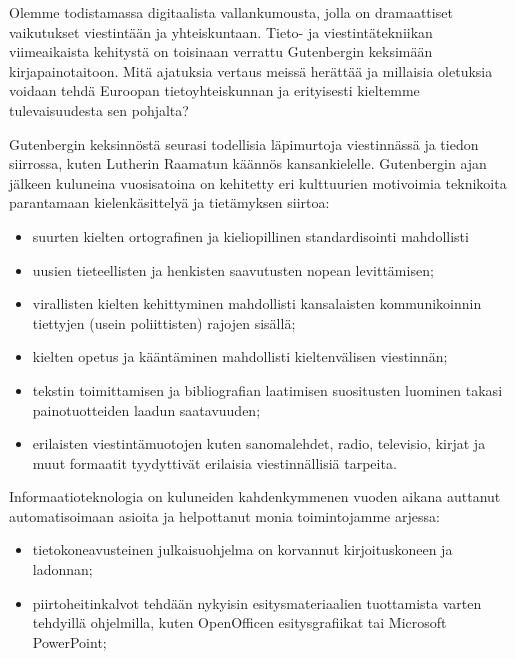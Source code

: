 \documentclass[]{../../metanetpaper}
\begin{document}
\begin{multicols}{2}

Olemme todistamassa digitaalista vallankumousta, jolla on dramaattiset
vaikutukset viestintään ja yhteiskuntaan. Tieto- ja viestintätekniikan
viimeaikaista kehitystä on toisinaan verrattu Gutenbergin keksimään
kirjapainotaitoon. Mitä ajatuksia vertaus meissä herättää ja millaisia
oletuksia voidaan tehdä Euroopan tietoyhteiskunnan ja erityisesti kieltemme
tulevaisuudesta sen pohjalta?

Gutenbergin keksinnöstä seurasi todellisia läpimurtoja viestinnässä ja tiedon
siirrossa, kuten Lutherin Raamatun käännös kansankielelle. Gutenbergin
ajan jälkeen kuluneina vuosisatoina on kehitetty eri kulttuurien motivoimia
teknikoita parantamaan kielenkäsittelyä ja tietämyksen siirtoa:
\begin{itemize}
\item suurten kielten ortografinen ja kieliopillinen standardisointi mahdollisti
\item uusien tieteellisten ja henkisten saavutusten nopean levittämisen;

\item virallisten kielten kehittyminen mahdollisti kansalaisten kommunikoinnin
tiettyjen (usein poliittisten) rajojen sisällä;

\item kielten opetus ja kääntäminen mahdollisti kieltenvälisen viestinnän;

\item tekstin toimittamisen ja bibliografian laatimisen suositusten luominen takasi
painotuotteiden laadun saatavuuden;

\item erilaisten viestintämuotojen kuten sanomalehdet, radio, televisio, kirjat ja
muut formaatit tyydyttivät erilaisia viestinnällisiä tarpeita.
\end{itemize}
Informaatioteknologia on kuluneiden kahdenkymmenen vuoden aikana auttanut
automatisoimaan asioita ja helpottanut monia toimintojamme arjessa:
\begin{itemize}
\item tietokoneavusteinen julkaisuohjelma on korvannut kirjoituskoneen ja ladonnan;

\item piirtoheitinkalvot tehdään nykyisin esitysmateriaalien
tuottamista varten tehdyillä ohjelmilla, kuten
\foreignlanguage{english}{OpenOfficen} esitysgrafiikat tai Microsoft
PowerPoint;


\end{itemize}
\end{multicols}
\end{document}
